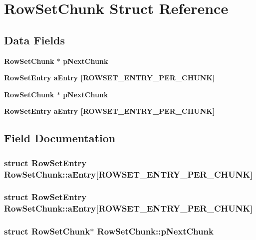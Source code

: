 \section{Row\-Set\-Chunk Struct Reference}
\label{structRowSetChunk}
\subsection*{Data Fields}
\begin{CompactItemize}
\item 
\bf{Row\-Set\-Chunk} $\ast$ \bf{p\-Next\-Chunk}
\item 
\bf{Row\-Set\-Entry} \bf{a\-Entry} [ROWSET\_\-ENTRY\_\-PER\_\-CHUNK]
\item 
\bf{Row\-Set\-Chunk} $\ast$ \bf{p\-Next\-Chunk}
\item 
\bf{Row\-Set\-Entry} \bf{a\-Entry} [ROWSET\_\-ENTRY\_\-PER\_\-CHUNK]
\end{CompactItemize}


\subsection{Field Documentation}
\subsubsection{\setlength{\rightskip}{0pt plus 5cm}struct \bf{Row\-Set\-Entry} \bf{Row\-Set\-Chunk::a\-Entry}[ROWSET\_\-ENTRY\_\-PER\_\-CHUNK]}\label{structRowSetChunk_dfc5b31ad7d543514092840a3bf10e73}


\subsubsection{\setlength{\rightskip}{0pt plus 5cm}struct \bf{Row\-Set\-Entry} \bf{Row\-Set\-Chunk::a\-Entry}[ROWSET\_\-ENTRY\_\-PER\_\-CHUNK]}\label{structRowSetChunk_dfc5b31ad7d543514092840a3bf10e73}


\subsubsection{\setlength{\rightskip}{0pt plus 5cm}struct \bf{Row\-Set\-Chunk}$\ast$ \bf{Row\-Set\-Chunk::p\-Next\-Chunk}}\label{structRowSetChunk_c41ec5d4f54ce8aa1e343494aafdb00d}


